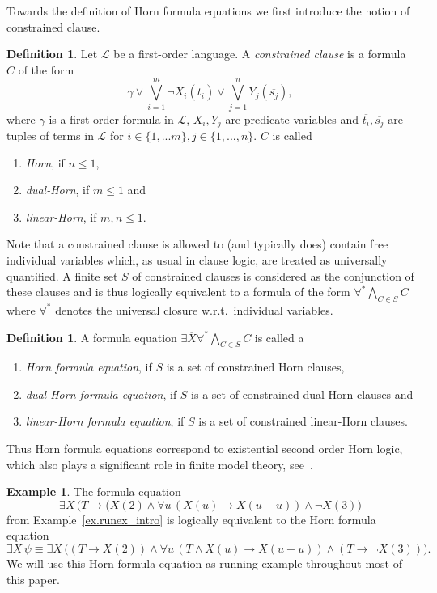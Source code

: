\documentclass[acmsmall]{acmart}
\theoremstyle{plain}
\theoremstyle{definition}
\newtheorem{definition}[theorem]{Definition}
\newtheorem{example}[theorem]{Example}
\newcommand{\calL}{\mathcal{L}}
\newcommand{\mybar}[1]{\overline{#1}}
\newcommand{\impl}{\rightarrow} %
\newcommand{\Land}{\bigwedge}
\begin{document}
Towards the definition of Horn formula equations we first introduce the notion of constrained clause.
%
 \begin{definition}
	Let $\calL$ be a first-order language. A \emph{constrained clause} is a formula $C$ of the form
	\[
	\gamma \vee \bigvee_{i =1}^m \neg X_i(\mybar{t_i}) \vee \bigvee_{j=1}^n Y_j(\mybar{s_j}),
	\]
	where $\gamma$ is a first-order formula in $\calL$, $X_i,Y_j$ are predicate variables and $\mybar{t_i},\mybar{s_j}$ are tuples of terms in $\calL$ for $i \in \{1,...m\}, j \in \{1,...,n\}$. $C$ is called
	\begin{enumerate}
		\item \emph{Horn}, if $n \leq 1$,
		\item \emph{dual-Horn}, if $m \leq 1$ and
		\item \emph{linear-Horn}, if $m,n \leq 1$.
	\end{enumerate}
\end{definition}

Note that a constrained clause is allowed to (and typically does) contain free individual variables which,
 as usual in clause logic, are treated as universally quantified.
A finite set $S$ of constrained clauses is considered as the conjunction of these clauses and is thus
 logically equivalent to a formula of the form $\forall^* \Land_{C\in S} C$ where $\forall^*$ denotes
 the universal closure w.r.t.\ individual variables.
 
 \begin{definition}
 	A formula equation $\exists \mybar{X} \forall^* \Land_{C\in S} C$ is called a
 	\begin{enumerate}
 		\item \emph{Horn formula equation}, if $S$ is a set of constrained Horn clauses,
 		\item \emph{dual-Horn formula equation}, if $S$ is a set of constrained dual-Horn clauses and
 		\item \emph{linear-Horn formula equation}, if $S$ is a set of constrained linear-Horn clauses.
 	\end{enumerate}

 \end{definition}

Thus Horn formula equations correspond to existential second order Horn logic, which also
 plays a significant role in finite model theory, see~\cite{Graedel91Expressive}.

\begin{example}\label{ex.runex}
The formula equation
\[
\exists X\, \big( T \impl (X(2) \land \forall u\, (X(u) \impl X(u+u)) \land \neg X(3) \big)
\]
from Example~\ref{ex.runex_intro} is logically equivalent to the Horn formula equation
\[
\exists X\, \psi \equiv \exists X\, \big( ( T \impl X(2) ) \land \forall u\, (T \land X(u) \impl X(u+u)) \land (T\impl \neg X(3)) \big).
\]
We will use this Horn formula equation as running example throughout most of this paper.
\end{example}
\end{document}

